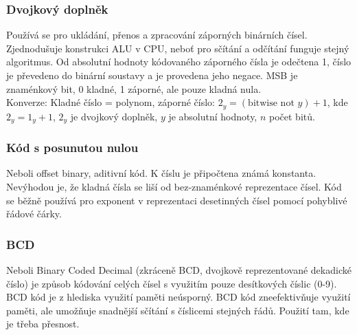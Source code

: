 \subsubsection{Dvojkový doplněk}
Používá se pro ukládání, přenos a zpracování záporných binárních čísel. Zjednodušuje konstrukci ALU v CPU, neboť pro sčítání a odčítání funguje stejný algoritmus.
Od absolutní hodnoty kódovaného záporného čísla je odečtena 1, číslo je převedeno do binární soustavy a je provedena jeho negace. MSB je znaménkový bit, 0 kladné, 1 záporné, ale pouze kladná nula. \\
Konverze: Kladné číslo = polynom, záporné číslo: $2_y = (\text{bitwise not } y) + 1$, kde $2_y  = 1_y + 1$, $2_y$ je dvojkový doplněk, $y$ je absolutní hodnoty, $n$ počet bitů.

\subsubsection{Kód s posunutou nulou}
Neboli offset binary, aditivní kód. K číslu je připočtena známá konstanta. Nevýhodou je, že kladná čísla se liší od bez-znaménkové reprezentace čísel.
Kód se běžně používá pro exponent v reprezentaci desetinných čísel pomocí pohyblivé řádové čárky.

\subsubsection{BCD}
Neboli Binary Coded Decimal (zkráceně BCD, dvojkově reprezentované dekadické číslo) je způsob kódování celých čísel s využitím pouze desítkových číslic (0-9).
BCD kód je z hlediska využití paměti neúsporný. BCD kód zneefektivňuje využití paměti, ale umožňuje snadnější sčítání s číslicemi stejných řádů. Použití tam, kde je třeba přesnost.

